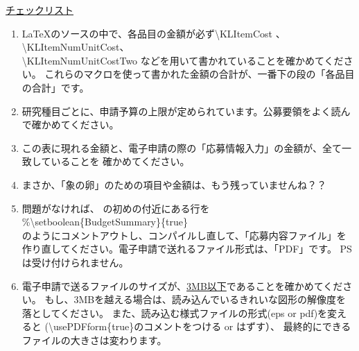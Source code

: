 \vspace{1cm}
\underline{チェックリスト}
\begin{enumerate}
	\item \LaTeX のソースの中で、各品目の金額が必ず\textbackslash KLItemCost 、
		\textbackslash KLItemNumUnitCost、\\
		\textbackslash KLItemNumUnitCostTwo などを用いて書かれていることを確かめてください。
		これらのマクロを使って書かれた金額の合計が、一番下の段の「各品目の合計」です。

%		
	
	\item 研究種目ごとに、申請予算の上限が定められています。公募要領をよく読んで確かめてください。
	\item この表に現れる金額と、電子申請の際の「応募情報入力」の金額が、全て一致していることを
		確かめてください。
		
	\item まさか、「象の卵」のための項目や金額は、もう残っていませんね？？
		
	\item 問題がなければ、 \KLMainFile の初めの付近にある行を\\
				\hspace{2cm}\%\textbackslash setboolean\{BudgetSummary\}\{true\}\\
		のようにコメントアウトし、コンパイルし直して、「応募内容ファイル」を
		作り直してください。電子申請で送れるファイル形式は、「PDF」です。
		PSは受け付けられません。
		
	\item 電子申請で送るファイルのサイズが、\underline{3MB以下}であることを確かめてください。
		もし、3MBを越える場合は、読み込んでいるきれいな図形の解像度を落としてください。
		また、読み込む様式ファイルの形式(eps or pdf)を変えると
		(\textbackslash usePDFform\{true\}のコメントをつける or はずす）、
		最終的にできるファイルの大きさは変わります。
\end{enumerate}
\clearpage
